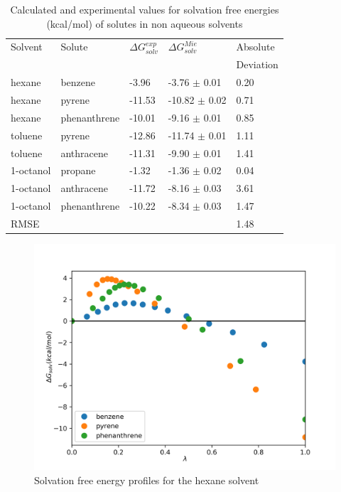 \begin{table}[h]
\centering
  \caption{Calculated and experimental values for solvation free energies (kcal/mol) of solutes in non aqueous solvents}
  \label{tbl:solv1}
  \begin{tabular}{lllll}
    \hline
      Solvent & Solute & $\Delta G_{solv}^{exp}$ & $\Delta G_{solv}^{Mie}$ & Absolute \\
      & & & &Deviation \\
    \hline
    hexane    & benzene      & -3.96  & -3.76  $\pm$ 0.01 & 0.20 \\
    hexane    & pyrene       & -11.53 & -10.82 $\pm$ 0.02 & 0.71 \\
    hexane    & phenanthrene & -10.01 & -9.16  $\pm$ 0.01 & 0.85 \\
    toluene   & pyrene       & -12.86 & -11.74 $\pm$ 0.01 & 1.11\\
    toluene   & anthracene   & -11.31 & -9.90 $\pm$ 0.01 & 1.41\\
    1-octanol & propane      & -1.32  & -1.36  $\pm$ 0.02 & 0.04 \\
    1-octanol & anthracene   & -11.72 & -8.16  $\pm$ 0.03 & 3.61 \\
    1-octanol & phenanthrene & -10.22 & -8.34  $\pm$ 0.03 & 1.47 \\
    \hline
    RMSE      &              &        &                   & 1.48     \\
    \hline
  \end{tabular}
\end{table}

\begin{figure}
\centering
\includegraphics[width=0.9\linewidth]{Figures/hex}
\caption{Solvation free energy profiles for the hexane solvent}
\label{fig:hex}
\end{figure}

